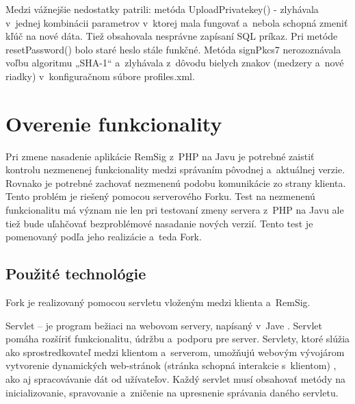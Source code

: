\documentclass[
  digital, %
  table,   %
oneside,
  nolof,     %
  nolot,     %
]{fithesis3}
\begin{document}
Medzi vážnejšie nedostatky patrili: metóda UploadPrivatekey() - zlyhávala v~jednej kombinácii parametrov v~ktorej mala fungovať a~nebola schopná zmeniť kľúč na nové dáta. Tiež obsahovala nesprávne zapísaní SQL príkaz. Pri metóde resetPassword() bolo staré heslo stále funkčné. Metóda signPkcs7 nerozoznávala voľbu algoritmu „SHA-1“ a~zlyhávala z~dôvodu bielych znakov (medzery a~nové riadky) v~konfiguračnom súbore profiles.xml. 



\section{Overenie funkcionality}
Pri zmene nasadenie aplikácie RemSig z~PHP na Javu je potrebné zaistiť kontrolu nezmenenej funkcionality medzi správaním pôvodnej a~aktuálnej verzie. Rovnako je potrebné zachovať nezmenenú podobu komunikácie zo strany klienta. Tento problém je riešený pomocou serverového Forku. Test na nezmenenú funkcionalitu má význam nie len pri testovaní zmeny servera z~PHP na Javu ale tiež bude uľahčovať bezproblémové nasadanie nových verzií. Tento test je pomenovaný podľa jeho realizácie a~teda Fork. 
\subsection{Použité technológie}
Fork je realizovaný pomocou servletu vloženým medzi klienta a~RemSig.

Servlet – je program bežiaci na webovom servery, napísaný v~Jave \cite{servlet}. Servlet pomáha rozšíriť  funkcionalitu, údržbu a~podporu pre server. Servlety, ktoré slúžia ako sprostredkovateľ medzi klientom a~serverom,  umožňujú webovým vývojárom vytvorenie dynamických web-stránok (stránka schopná interakcie s~klientom) \cite{staticVsDynamic}, ako aj spracovávanie dát od užívateľov. Každý servlet musí obsahovať metódy na inicializovanie, spravovanie a~zničenie na upresnenie správania daného servletu.
\end{document}
